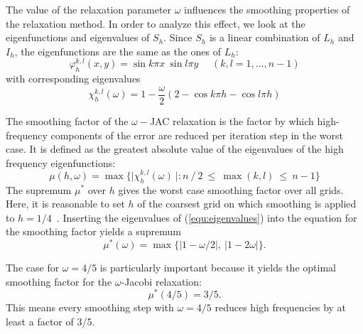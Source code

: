 The value of the relaxation parameter $\omega$ influences the smoothing properties of the relaxation method. In order to analyze this effect, we look at the eigenfunctions and eigenvalues of $S_h$. Since $S_h$ is a linear combination of $L_h$ and $I_h$, the eigenfunctions are the same as the ones of $L_h$:
\begin{equation}
\varphi_h ^{k,l}(x,y) = \sin k \pi x~ \sin l \pi y \text{~~~~}(k,l = 1, \hdots, n-1)
\end{equation}
with corresponding eigenvalues 
\begin{equation}
\chi_h^{k,l}(\omega) = 1- \frac{\omega}{2}(2-\cos k \pi h - \cos l \pi h)
\label{equ:eigenvalues}
\end{equation}

The smoothing factor of the $\omega-$JAC relaxation is the factor by which high-frequency components of the error are reduced per iteration step in the worst case. It is defined as the greatest absolute value of the eigenvalues of the high frequency eigenfunctions:
\begin{equation}
\mu (h,\omega) = \max \Big\{\Big|\chi_h^{k,l}(\omega)~\Big|: n~/~2 ~\leq ~\max(k,l) ~\leq ~n-1 \Big\} 
\end{equation}
The supremum $\mu^*$ over $h$  gives the worst case smoothing factor over all grids. Here, it is reasonable to set $h$ of the coarsest grid on which smoothing is applied to $h = 1/4$~\cite{Trottenberg:2000:MUL:374106}. Inserting the eigenvalues of (\ref{equ:eigenvalues}) into the equation for the smoothing factor yields a supremum 
\begin{equation}
\mu^* (\omega) = \max \big\{\big|1-\omega/2\big|,~\big|1-2\omega\big| \big\}.
\end{equation}


The case for $\omega = 4/5$ is particularly important because it yields the optimal smoothing factor for the $\omega$-Jacobi relaxation:
\begin{equation}
\mu^*(4/5) = 3/5.
\end{equation}
This means every smoothing step with $\omega = 4/5$ reduces high frequencies by at least a factor of 3/5.

